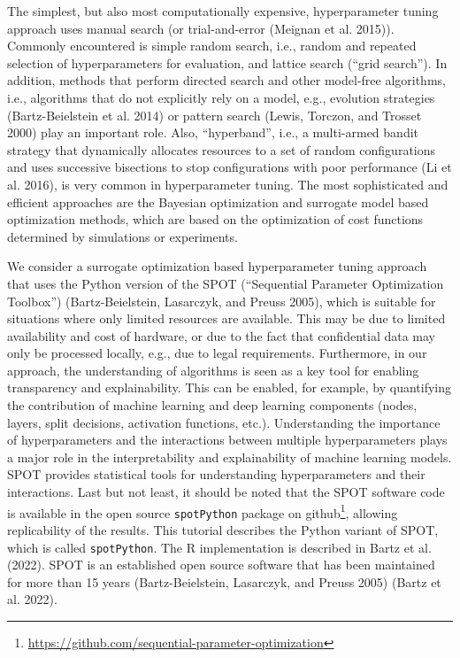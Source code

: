 \documentclass[
  letterpaper,
  DIV=11,
  numbers=noendperiod]{scrreprt}
\begin{document}
The simplest, but also most computationally expensive, hyperparameter
tuning approach uses manual search (or trial-and-error (Meignan et al.
2015)). Commonly encountered is simple random search, i.e., random and
repeated selection of hyperparameters for evaluation, and lattice search
(``grid search''). In addition, methods that perform directed search and
other model-free algorithms, i.e., algorithms that do not explicitly
rely on a model, e.g., evolution strategies (Bartz-Beielstein et al.
2014) or pattern search (Lewis, Torczon, and Trosset 2000) play an
important role. Also, ``hyperband'', i.e., a multi-armed bandit strategy
that dynamically allocates resources to a set of random configurations
and uses successive bisections to stop configurations with poor
performance (Li et al. 2016), is very common in hyperparameter tuning.
The most sophisticated and efficient approaches are the Bayesian
optimization and surrogate model based optimization methods, which are
based on the optimization of cost functions determined by simulations or
experiments.

We consider a surrogate optimization based hyperparameter tuning
approach that uses the Python version of the SPOT (``Sequential
Parameter Optimization Toolbox'') (Bartz-Beielstein, Lasarczyk, and
Preuss 2005), which is suitable for situations where only limited
resources are available. This may be due to limited availability and
cost of hardware, or due to the fact that confidential data may only be
processed locally, e.g., due to legal requirements. Furthermore, in our
approach, the understanding of algorithms is seen as a key tool for
enabling transparency and explainability. This can be enabled, for
example, by quantifying the contribution of machine learning and deep
learning components (nodes, layers, split decisions, activation
functions, etc.). Understanding the importance of hyperparameters and
the interactions between multiple hyperparameters plays a major role in
the interpretability and explainability of machine learning models. SPOT
provides statistical tools for understanding hyperparameters and their
interactions. Last but not least, it should be noted that the SPOT
software code is available in the open source \texttt{spotPython}
package on github\footnote{\url{https://github.com/sequential-parameter-optimization}},
allowing replicability of the results. This tutorial describes the
Python variant of SPOT, which is called \texttt{spotPython}. The R
implementation is described in Bartz et al. (2022). SPOT is an
established open source software that has been maintained for more than
15 years (Bartz-Beielstein, Lasarczyk, and Preuss 2005) (Bartz et al.
2022).
\end{document}
